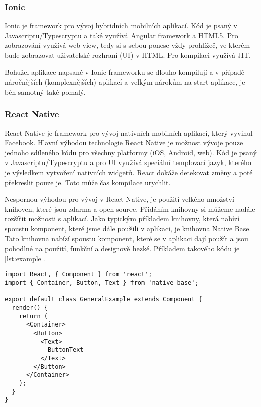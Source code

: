 \documentclass[11pt,twoside,a4paper]{book}
\begin{document}
\subsubsection{Ionic}
Ionic je framework pro vývoj hybridních mobilních aplikací. Kód je psaný v Javascriptu/Typescryptu a také využívá Angular framework a HTML5. Pro zobrazování využívá web view, tedy si s sebou ponese vždy prohlížeč, ve kterém bude zobrazovat uživatelské rozhraní (UI) v HTML. Pro kompilaci využívá JIT. \cite{cruxlab}

Bohužel aplikace napsané v Ionic frameworku se dlouho kompilují a v případě náročnějších (komplexnějších) aplikací a velkým nárokům na start aplikace, je běh samotný také pomalý.

\subsubsection{React Native}
React Native je framework pro vývoj nativních mobilních aplikací, který vyvinul Facebook. Hlavní výhodou technologie React Native je možnost vývoje pouze jednoho sdíleného kódu pro všechny platformy (iOS, Android, web). Kód je psaný v Javascriptu/Typescryptu a pro UI využívá speciální templovací jazyk, kterého je výsledkem vytvoření nativních widgetů. React dokáže detekovat změny a poté překreslit pouze je. Toto může čas kompilace urychlit. \cite{eisenman_2016}

Nespornou výhodou pro vývoj v React Native, je použití velkého množství knihoven, které jsou zdarma a open source. Přidáním knihovny si můžeme nadále rozšířit možnosti s aplikací. Jako typickým příkladem knihovny, která nabízí spoustu komponent, které jsme dále použili v aplikaci, je knihovna Native Base. Tato knihovna nabízí spoustu komponent, které se v aplikaci dají použít a jsou pohodlné na použití, funkční a designově hezké. Příkladem takového kódu je \ref{lst:example}.

\begin{minipage}{\linewidth}
\begin{lstlisting}[caption=Základní syntaxe NativeBase komponenty, label={lst:example}]
import React, { Component } from 'react';
import { Container, Button, Text } from 'native-base';

export default class GeneralExample extends Component {
  render() {
    return (
      <Container>
        <Button>
          <Text>
            ButtonText
          </Text>
        </Button>
      </Container>
    );
  }
}
\end{lstlisting}
\end{minipage}
\end{document}
